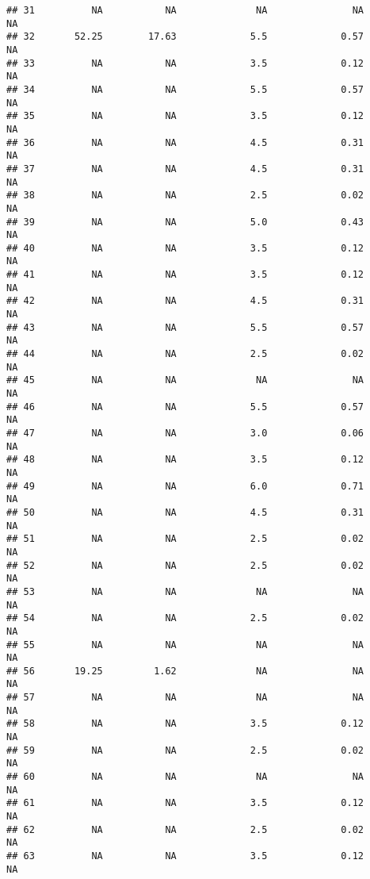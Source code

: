 \documentclass[]{article}
\begin{document}
\begin{verbatim}
## 31          NA           NA              NA               NA              NA
## 32       52.25        17.63             5.5             0.57              NA
## 33          NA           NA             3.5             0.12              NA
## 34          NA           NA             5.5             0.57              NA
## 35          NA           NA             3.5             0.12              NA
## 36          NA           NA             4.5             0.31              NA
## 37          NA           NA             4.5             0.31              NA
## 38          NA           NA             2.5             0.02              NA
## 39          NA           NA             5.0             0.43              NA
## 40          NA           NA             3.5             0.12              NA
## 41          NA           NA             3.5             0.12              NA
## 42          NA           NA             4.5             0.31              NA
## 43          NA           NA             5.5             0.57              NA
## 44          NA           NA             2.5             0.02              NA
## 45          NA           NA              NA               NA              NA
## 46          NA           NA             5.5             0.57              NA
## 47          NA           NA             3.0             0.06              NA
## 48          NA           NA             3.5             0.12              NA
## 49          NA           NA             6.0             0.71              NA
## 50          NA           NA             4.5             0.31              NA
## 51          NA           NA             2.5             0.02              NA
## 52          NA           NA             2.5             0.02              NA
## 53          NA           NA              NA               NA              NA
## 54          NA           NA             2.5             0.02              NA
## 55          NA           NA              NA               NA              NA
## 56       19.25         1.62              NA               NA              NA
## 57          NA           NA              NA               NA              NA
## 58          NA           NA             3.5             0.12              NA
## 59          NA           NA             2.5             0.02              NA
## 60          NA           NA              NA               NA              NA
## 61          NA           NA             3.5             0.12              NA
## 62          NA           NA             2.5             0.02              NA
## 63          NA           NA             3.5             0.12              NA

\end{verbatim}
\end{document}
